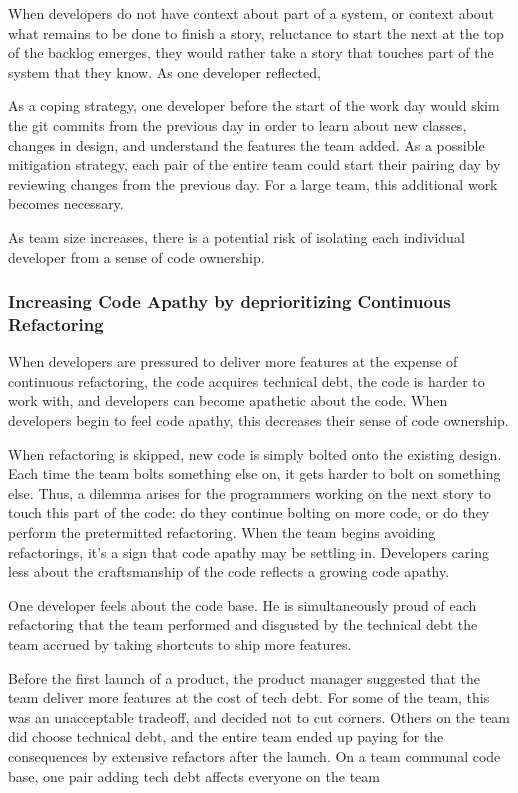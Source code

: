 When developers do not have context about part of a system, or context about what remains to be done to finish a story, reluctance to start the next at the top of the backlog emerges, they would rather take a story that touches part of the system that they know. As one developer reflected, 

As a coping strategy, one developer before the start of the work day would skim the git commits from the previous day in order to learn about new classes, changes in design, and understand the features the team added. As a possible mitigation strategy, each pair of the entire team could start their pairing day by reviewing changes from the previous day. For a large team, this additional work becomes necessary. 

As team size increases, there is a potential risk of isolating each individual developer from a sense of code ownership. 

\subsubsection{ Increasing Code Apathy by deprioritizing Continuous Refactoring }

When developers are pressured to deliver more features at the expense of continuous refactoring, the code acquires technical debt, the code is harder to work with, and developers can become apathetic about the code. When developers begin to feel code apathy, this decreases their sense of code ownership. 

When refactoring is skipped, new code is simply bolted onto the existing design. Each time the team bolts something else on, it gets harder to bolt on something else. Thus, a dilemma arises for the programmers working on the next story to touch this part of the code: do they continue bolting on more code, or do they perform the pretermitted refactoring. When the team begins avoiding refactorings, it's a sign that code apathy may be settling in. Developers caring less about the craftsmanship of the code reflects a growing code apathy. 

One developer feels  about the code base. He is simultaneously proud of each refactoring that the team performed and disgusted by the technical debt the team accrued by taking shortcuts to ship more features. 

Before the first launch of a product, the product manager suggested that the team deliver more features at the cost of tech debt. For some of the team, this was an unacceptable tradeoff, and decided not to cut corners. Others on the team did choose technical debt, and the entire team ended up paying for the consequences by extensive refactors after the launch. On a team communal code base, one pair adding tech debt affects everyone on the team

